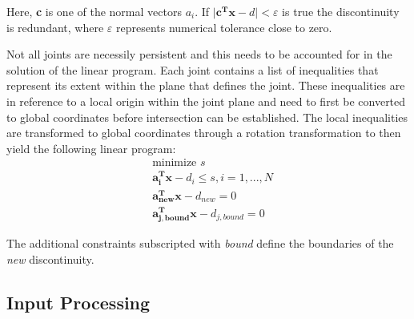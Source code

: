 Here, \textbf{c} is one of the normal vectors $a_{i}$. If $\vert \boldsymbol{c^{T} x} - d \vert < \varepsilon$ is true the discontinuity is redundant, where $\varepsilon$ represents numerical tolerance close to zero. \par

Not all joints are necessily persistent and this needs to be accounted for in the solution of the linear program. Each joint contains a list of inequalities that represent its extent within the plane that defines the joint. These inequalities are in reference to a local origin within the joint plane and need to first be converted to global coordinates before intersection can be established. The local inequalities are transformed to global coordinates through a rotation transformation to then yield the following linear program: 
\begin{equation}
\begin{aligned} 
&\text{minimize } s\\
&\boldsymbol{a_{i}^{T} x} - d_i \leq s, i = 1,...,N\\
&\boldsymbol{a_{new}^{T} x} - d_{new} = 0\\
&\boldsymbol{a_{j,bound}^{T} x} - d_{j,bound} = 0
\end{aligned}
\end{equation}


The additional constraints subscripted with \textit{bound} define the boundaries of the \textit{new} discontinuity. 

\subsection{Input Processing}
